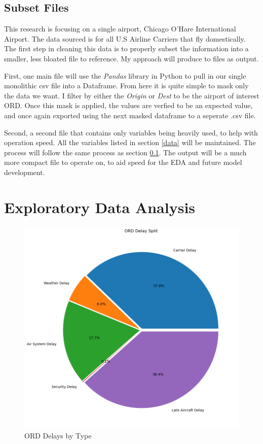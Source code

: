 \documentclass[a4paper,11pt]{article}
\begin{document}
\subsection{Subset Files} \label{datasubset}
This research is focusing on a single airport, Chicago O'Hare International Airport. The data sourced is for all U.S Airline Carriers that fly domestically.
The first step in cleaning this data is to properly subset the information into a smaller, less bloated file to reference. My approach will produce to files as output.

First, one main file will use the \emph{Pandas} library in Python to pull in our single monolithic csv file into a Dataframe. From here it is quite simple to mask only the data we want.
I filter by either the \emph{Origin} or \emph{Dest} to be the airport of interest ORD.
Once this mask is applied, the values are verfied to be an expected value, and once again exported using the next masked dataframe to a seperate .csv file. 

Second, a second file that contains only variables being heavily used, to help with operation speed. All the variables listed in section \ref{data} will be maintained.
The process will follow the same process as section \ref{datasubset}. The output will be a much more compact file to operate on, to aid speed for the EDA and future model development.

\section{Exploratory Data Analysis}

\begin{figure}
    \centering
    \includegraphics*[scale=.5]{../../img/ord_delay_split_pie.png}
    \caption[Delays by Type]{ORD Delays by Type}
    \label{fig:delaybytype}
\end{figure}
\end{document}
